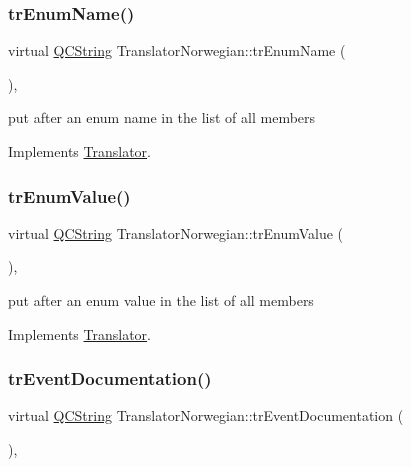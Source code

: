 \subsubsection{\texorpdfstring{trEnumName()}{trEnumName()}}
{\footnotesize\ttfamily virtual \mbox{\hyperlink{class_q_c_string}{Q\+C\+String}} Translator\+Norwegian\+::tr\+Enum\+Name (\begin{DoxyParamCaption}{ }\end{DoxyParamCaption})\hspace{0.3cm}{\ttfamily [inline]}, {\ttfamily [virtual]}}

put after an enum name in the list of all members 

Implements \mbox{\hyperlink{class_translator}{Translator}}.

\mbox{\label{class_translator_norwegian_a7b2dc9ecbf53486bbbed091e5686ad1d}} 
\subsubsection{\texorpdfstring{trEnumValue()}{trEnumValue()}}
{\footnotesize\ttfamily virtual \mbox{\hyperlink{class_q_c_string}{Q\+C\+String}} Translator\+Norwegian\+::tr\+Enum\+Value (\begin{DoxyParamCaption}{ }\end{DoxyParamCaption})\hspace{0.3cm}{\ttfamily [inline]}, {\ttfamily [virtual]}}

put after an enum value in the list of all members 

Implements \mbox{\hyperlink{class_translator}{Translator}}.

\mbox{\label{class_translator_norwegian_aacb68c4305d381ff5c6168b6d82636c7}} 
\subsubsection{\texorpdfstring{trEventDocumentation()}{trEventDocumentation()}}
{\footnotesize\ttfamily virtual \mbox{\hyperlink{class_q_c_string}{Q\+C\+String}} Translator\+Norwegian\+::tr\+Event\+Documentation (\begin{DoxyParamCaption}{ }\end{DoxyParamCaption})\hspace{0.3cm}{\ttfamily [inline]}, {\ttfamily [virtual]}}

